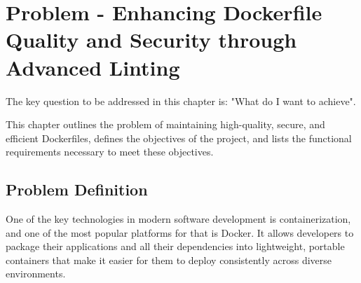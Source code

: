 \chapter{Problem - Enhancing Dockerfile Quality and Security through Advanced Linting}
\label{chap:problem}
The key question to be addressed in this chapter is: "What do I want to achieve".

This chapter outlines the problem of maintaining high-quality, secure, and efficient Dockerfiles, defines the objectives of the project, and lists the functional requirements necessary to meet these objectives.

\section{Problem Definition}
One of the key technologies in modern software development is containerization, and one of the most popular platforms for that is Docker. It allows developers to package their applications and all their dependencies into lightweight, portable containers that make it easier for them to deploy consistently across diverse environments.

